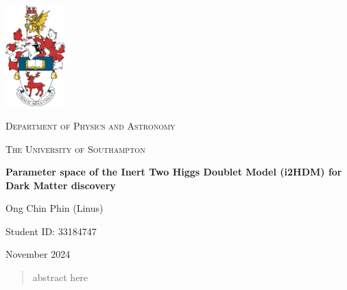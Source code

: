 \documentclass[12pt]{article}
\begin{document}
\titleformat{\section}{\large\bfseries}{\thesection}{0.5em}{}

\titleformat{\subsection}{\large\bfseries}{\thesubsection}{1em}{}

\begin{titlepage}
    \centering
    \includegraphics[width=2.3cm]{crest.jpg}\par
    \vspace{1cm}
    {\scshape\Large Department of Physics and Astronomy \par}
    \vspace{1cm}
    {\scshape\Large The University of Southampton \par}
    \vspace{1cm}
    \vspace{1cm}
    {\huge\bfseries Parameter space of the Inert Two Higgs Doublet Model (i2HDM) for Dark Matter discovery\par}
    \vspace{1cm}
    {\Large Ong Chin Phin (Linus) \par}
    \vspace{1cm}
    {\Large Student ID: 33184747 \par}
    \vfill
    {\large November 2024 \par}
\end{titlepage}

\newpage
\tableofcontents
\thispagestyle{empty}

\newpage
\thispagestyle{empty}
\begin{abstract}
abstract here
\end{abstract}
\end{document}

